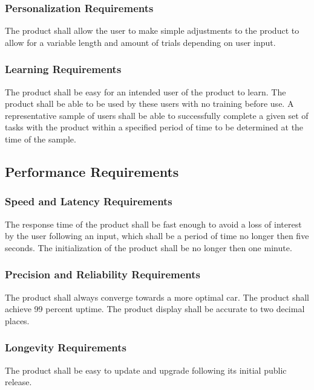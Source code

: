 \documentclass[12pt, titlepage]{article}
\begin{document}
\subsubsection{Personalization Requirements}

The product shall allow the user to make simple adjustments to the product to allow for a variable length and amount of trials depending on user input. 

\subsubsection{Learning Requirements}

The product shall be easy for an intended user of the product to learn. The product shall be able to be used by these users with no training before use. A representative sample of users shall be able to successfully complete a given set of tasks with the product within a specified period of time to be determined at the time of the sample.

\subsection{Performance Requirements}

\subsubsection{Speed and Latency Requirements}

The response time of the product shall be fast enough to avoid a loss of interest by the user following an input, which shall be a period of time no longer then five seconds. The initialization of the product shall be no longer then one minute.

\subsubsection{Precision and Reliability Requirements}

The product shall always converge towards a more optimal car. The product shall achieve 99 percent uptime. The product display shall be accurate to two decimal places.

\subsubsection{Longevity Requirements}

The product shall be easy to update and upgrade following its initial public release. 
\end{document}

